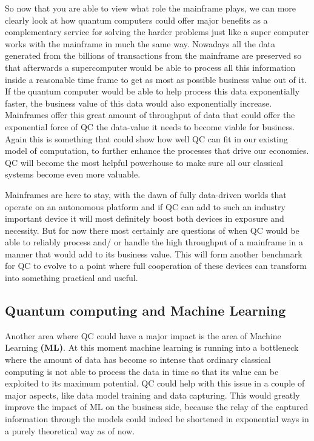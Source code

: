 So now that you are able to view what role the mainframe plays, we can more clearly look at how quantum computers could offer major benefits as a complementary service for solving the harder problems just like a super computer works with the mainframe in much the same way. Nowadays all the data generated from the billions of transactions from the mainframe are preserved so that afterwards a supercomputer would be able to process all this information inside a reasonable time frame to get as most as possible business value out of it. If the quantum computer would be able to help process this data exponentially faster, the business value of this data would also exponentially increase. Mainframes offer this great amount of throughput of data that could offer the exponential force of QC the data-value it needs to become viable for business. Again this is something that could show how well QC can fit in our existing model of computation, to further enhance the processes that drive our economies. QC will become the most helpful powerhouse to make sure all our classical systems become even more valuable.

Mainframes are here to stay, with the dawn of fully data-driven worlds that operate on an autonomous platform and if QC can add to such an industry important device it will most definitely boost both devices in exposure and necessity. But for now there most certainly are questions of when QC would be able to reliably process and/ or handle the high throughput of a mainframe in a manner that would add to its business value. This will form another benchmark for QC to evolve to a point where full cooperation of these devices can transform into something practical and useful.




\subsection{Quantum computing and Machine Learning}

Another area where QC could have a major impact is the area of Machine Learning \textbf{(ML)}. At this moment machine learning is running into a bottleneck where the amount of data has become so intense that ordinary classical computing is not able to process the data in time so that its value can be exploited to its maximum potential. QC could help with this issue in a couple of major aspects, like data model training and data capturing. This would greatly improve the impact of ML on the business side, because the relay of the captured information through the models could indeed be shortened in exponential ways in a purely theoretical way as of now. \autocite{Biamonte2017}


